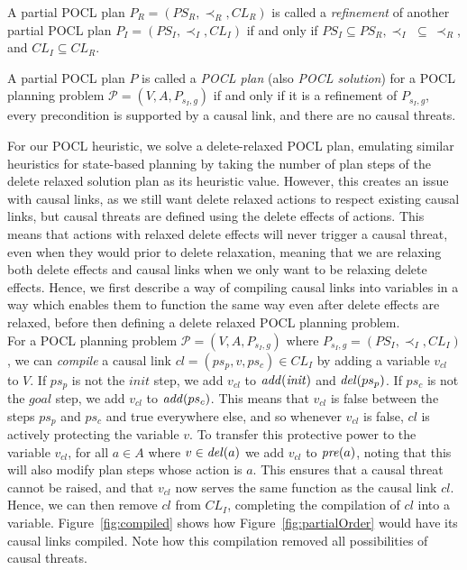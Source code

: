 \begin{definition}
    A partial POCL plan $P_R=(PS_R,\prec_R,CL_R)$ is called a \textit{refinement} of another partial POCL plan $P_I=(PS_I,\prec_I,CL_I)$ if and only if $PS_I\subseteq PS_R,\prec_I\,\,\subseteq\, \prec_R$, and $CL_I\subseteq CL_R$.
\end{definition}


\begin{definition}
    A partial POCL plan $P$ is called a \textit{POCL plan} (also \textit{POCL solution}) for a POCL planning problem $\mathcal{P}=(V, A, P_{s_I,g})$ if and only if it is a refinement of $P_{s_I,g}$, every precondition is supported by a causal link, and there are no causal threats.
\end{definition}


For our POCL heuristic, we solve a delete-relaxed POCL plan, emulating similar heuristics for state-based planning by taking the number of plan steps of the delete relaxed solution plan as its heuristic value. However, this creates an issue with causal links, as we still want delete relaxed actions to respect existing causal links, but causal threats are defined using the delete effects of actions. This means that actions with relaxed delete effects will never trigger a causal threat, even when they would prior to delete relaxation, meaning that we are relaxing both delete effects and causal links when we only want to be relaxing delete effects. Hence, we first describe a way of compiling causal links into variables in a way which enables them to function the same way even after delete effects are relaxed, before then defining a delete relaxed POCL planning problem.\\



For a POCL planning problem $\mathcal{P}=(V, A, P_{s_I,g})$ where $P_{s_I,g}=(PS_I, \prec_I, CL_I)$, we can \textit{compile} a causal link $cl=(ps_p,v,ps_c)\in CL_I$ by adding a variable $v_{cl}$ to $V$. If $ps_p$ is not the $\mathit{init}$ step, we add $v_{cl}$ to $\mathit{add} (\mathit{init})$ and $\mathit{del} (ps_p)$. If $ps_c$ is not the $\mathit{goal}$ step, we add $v_{cl}$ to $\mathit{add} (ps_c)$. This means that $v_{cl}$ is false between the steps $ps_p$ and $ps_c$ and true everywhere else, and so whenever $v_{cl}$ is false, $cl$ is actively protecting the variable $v$. To transfer this protective power to the variable $v_{cl}$, for all $a\in A$ where $v\in \mathit{del} (a)$ we add $v_{cl}$ to $\mathit{pre} (a)$, noting that this will also modify plan steps whose action is $a$. This ensures that a causal threat cannot be raised, and that $v_{cl}$ now serves the same function as the causal link $cl$. Hence, we can then remove $cl$ from $CL_I$, completing the compilation of $cl$ into a variable. Figure~\ref{fig:compiled} shows how Figure~\ref{fig:partialOrder} would have its causal links compiled. Note how this compilation removed all possibilities of causal threats.\\


